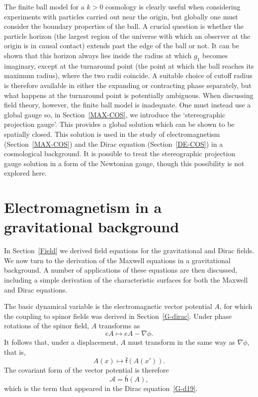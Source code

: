 \documentclass[a4paper]{article}
\numberwithin{equation}{section}
\newcommand{\cla}{{\mathcal{A}}}
\newcommand{\lbf}{\bar{\mathsf{f}}}
\newcommand{\lbh}{\bar{\mathsf{h}}}
\newcommand{\ho}{\lbh}
\newcommand{\fo}{\lbf}
\newcommand{\grad}{\nabla}
\begin{document}
The finite ball model for a $k>0$ cosmology is clearly useful when
considering experiments with particles carried out near the origin,
but globally one must consider the boundary properties of the ball.  A
crucial question is whether the particle horizon (the largest region
of the universe with which an observer at the origin is in causal
contact) extends past the edge of the ball or not.  It can be shown
that this horizon always lies inside the radius at which $g_1$ becomes
imaginary, except at the turnaround point (the point at which the ball
reaches its maximum radius), where the two radii coincide.  A suitable
choice of cutoff radius is therefore available in either the expanding
or contracting phase separately, but what happens at the turnaround
point is potentially ambiguous.  When discussing field theory,
however, the finite ball model is inadequate.  One must instead use a
global gauge so, in Section~\ref{MAX-COS}, we introduce the
`stereographic projection gauge'.  This provides a global solution
which can be shown to be spatially closed.  This solution is used in
the study of electromagnetism (Section~\ref{MAX-COS}) and the Dirac
equation (Section~\ref{DE-COS}) in a cosmological background.  It is
possible to treat the stereographic projection gauge solution in a
form of the Newtonian gauge, though this possibility is not explored
here.




\section[Electromagnetism in a gravitational background]{Electromagnetism in a gravitational \newline background} 
\label{MAX}

In Section~\ref{Field} we derived field equations for the
gravitational and Dirac fields.  We now turn to the derivation of the
Maxwell equations in a gravitational background.  A number of
applications of these equations are then discussed, including a simple
derivation of the characteristic surfaces for both the Maxwell and
Dirac equations.


The basic dynamical variable is the electromagnetic vector potential
$A$, for which the coupling to spinor fields was derived in
Section~\ref{G-dirac}.  Under phase rotations of the spinor field, $A$
transforms as
%
\begin{equation}
eA \mapsto eA - \grad \phi.
\label{em1}
\end{equation}
%
It follows that, under a displacement, $A$ must transform in the same
way as $\grad\phi$, that is,
%
\begin{equation}
A(x) \mapsto \fo(A(x')).
\end{equation}
%
The covariant form of the vector potential is therefore 
%
\begin{equation}
\cla=\ho(A),
\end{equation}
%
which is the term that appeared in the Dirac equation~\eqref{G-d19}.  
\end{document}
